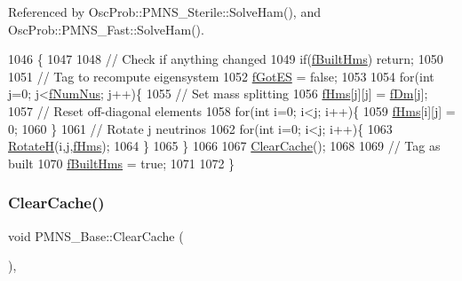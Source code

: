 Referenced by Osc\+Prob\+::\+P\+M\+N\+S\+\_\+\+Sterile\+::\+Solve\+Ham(), and Osc\+Prob\+::\+P\+M\+N\+S\+\_\+\+Fast\+::\+Solve\+Ham().


\begin{DoxyCode}
1046 \{
1047 
1048   \textcolor{comment}{// Check if anything changed}
1049   \textcolor{keywordflow}{if}(\hyperlink{classOscProb_1_1PMNS__Base_a9ac3cadeac8db1b90f3152f476244780}{fBuiltHms}) \textcolor{keywordflow}{return};
1050   
1051   \textcolor{comment}{// Tag to recompute eigensystem}
1052   \hyperlink{classOscProb_1_1PMNS__Base_a6dc5cd010d2d70b2324745b4e53e9839}{fGotES} = \textcolor{keyword}{false};
1053 
1054   \textcolor{keywordflow}{for}(\textcolor{keywordtype}{int} j=0; j<\hyperlink{classOscProb_1_1PMNS__Base_a24bb74bed63569dfe88b18fa6a08060e}{fNumNus}; j++)\{
1055     \textcolor{comment}{// Set mass splitting}
1056     \hyperlink{classOscProb_1_1PMNS__Base_acd3c8783e7603081eab316ea4c86c766}{fHms}[j][j] = \hyperlink{classOscProb_1_1PMNS__Base_a406a31c3b5d620e5a0cace5b411f9f70}{fDm}[j];
1057     \textcolor{comment}{// Reset off-diagonal elements}
1058     \textcolor{keywordflow}{for}(\textcolor{keywordtype}{int} i=0; i<j; i++)\{
1059       \hyperlink{classOscProb_1_1PMNS__Base_acd3c8783e7603081eab316ea4c86c766}{fHms}[i][j] = 0;
1060     \}
1061     \textcolor{comment}{// Rotate j neutrinos}
1062     \textcolor{keywordflow}{for}(\textcolor{keywordtype}{int} i=0; i<j; i++)\{
1063       \hyperlink{classOscProb_1_1PMNS__Base_a6a3cf45bbe2349abf06708b65677c044}{RotateH}(i,j,\hyperlink{classOscProb_1_1PMNS__Base_acd3c8783e7603081eab316ea4c86c766}{fHms});
1064     \}
1065   \}
1066 
1067   \hyperlink{classOscProb_1_1PMNS__Base_ac47fd33e69aa6490f99e2fd147a92f03}{ClearCache}();
1068 
1069   \textcolor{comment}{// Tag as built}
1070   \hyperlink{classOscProb_1_1PMNS__Base_a9ac3cadeac8db1b90f3152f476244780}{fBuiltHms} = \textcolor{keyword}{true};
1071 
1072 \}
\end{DoxyCode}
\mbox{\label{classOscProb_1_1PMNS__Base_ac47fd33e69aa6490f99e2fd147a92f03}} 
\subsubsection{\texorpdfstring{Clear\+Cache()}{ClearCache()}}
{\footnotesize\ttfamily void P\+M\+N\+S\+\_\+\+Base\+::\+Clear\+Cache (\begin{DoxyParamCaption}{ }\end{DoxyParamCaption})\hspace{0.3cm}{\ttfamily [virtual]}, {\ttfamily [inherited]}}

